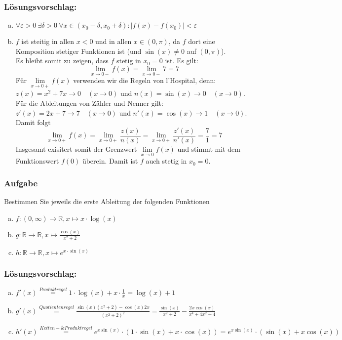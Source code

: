 \documentclass[a4paper,11pt]{scrartcl}
\newcounter{auf}
\newcommand{\Aufgabe}%
        {\addtocounter{auf}{1} \subsubsection*{\rmfamily  Aufgabe \theauf \hspace{1em}} }
\newcommand{\RR}{\mathbb{R}}
\begin{document}
\subsubsection*{Lösungsvorschlag:}
\begin{enumerate}[a)]
\item $\forall \varepsilon >0\ \exists \delta>0\ \forall x \in (x_0-\delta, x_0+\delta): |f(x)-f(x_0)|< \varepsilon$
\item $f$ ist steitig in allen $x<0$ und in allen $x \in (0,\pi)$, da $f$ dort eine Komposition stetiger Funktionen ist (und $\sin(x)\ne 0$ auf $(0,\pi)$).\\ 
Es bleibt somit zu zeigen, dass $f$ stetig in $x_0=0$ ist. Es gilt:
$$
\lim_{x \to 0-} f(x)=\lim_{x \to 0-} 7 =7
$$
Für $\lim \limits_{x \to 0+} f(x)$ verwenden wir die Regeln von l'Hospital, denn:\\
$z(x)=x^2+7x \to 0 \quad (x \to 0)$ und $n(x)=\sin(x) \to 0 \quad (x\to 0)$.\\
Für die Ableitungen von Zähler und Nenner gilt:\\
$z'(x)=2x+7 \to 7 \quad (x \to 0)$ und $n'(x)=\cos(x) \to 1 \quad (x\to 0)$.\\
Damit folgt
$$
\lim_{x \to 0+} f(x)=\lim_{x \to 0+} \frac{z(x)}{n(x)}=\lim_{x \to 0+} \frac{z'(x)}{n'(x)}=\frac{7}{1}=7
$$
Insgesamt exisitert somit der Grenzwert $\lim \limits_{x \to 0} f(x)$ und stimmt mit dem Funktionswert $f(0)$ überein. Damit ist $f$ auch stetig in $x_0=0$.
\end{enumerate}


\newpage
\Aufgabe
Bestimmen Sie jeweils die erste Ableitung der folgenden Funktionen

\begin{enumerate}[a)]
\item $f:(0,\infty) \to \RR, x \mapsto x \cdot \log(x) $
\item $g: \RR \to \RR, x \mapsto\frac{\cos(x)}{x^2+2}$
\item $h:\RR \to \RR, x \mapsto e^{x\cdot \sin(x)} $
\end{enumerate}

\subsubsection*{Lösungsvorschlag:}

\begin{enumerate}[a)]
\item $f'(x)\stackrel{Produktregel}{=}1\cdot \log(x)+x\cdot \frac{1}{x}=\log(x)+1$
\item $g'(x)\stackrel{Quotientenregel}{=}\frac{\sin(x)(x^2+2)-\cos(x)2x}{(x^2+2)^2}=\frac{\sin(x)}{x^2+2}-\frac{2x\cos(x)}{x^4+4x^2+4}$
\item $h'(x)\stackrel{Ketten- \& Produktregel}{=}e^{x\sin(x)}\cdot (1\cdot \sin(x)+x\cdot \cos(x))=e^{x\sin(x)}\cdot (\sin(x)+x\cos(x))$
\end{enumerate}
\end{document}
